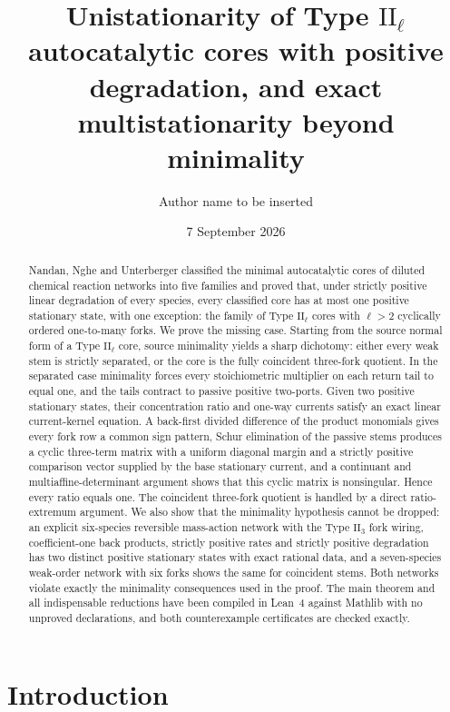 \documentclass[11pt,reqno]{amsart}
\title[Unistationarity of Type $\mathrm{II}_\ell$ autocatalytic cores]{Unistationarity of Type $\mathrm{II}_\ell$ autocatalytic cores with positive degradation, and exact multistationarity beyond minimality}
\author{Author name to be inserted}
\date{7 September 2026}
\theoremstyle{plain}
\theoremstyle{definition}
\theoremstyle{remark}
\numberwithin{equation}{section}
\begin{document}
\begin{abstract}
Nandan, Nghe and Unterberger classified the minimal autocatalytic cores of diluted chemical reaction networks into five families and proved that, under strictly positive linear degradation of every species, every classified core has at most one positive stationary state, with one exception: the family of Type $\mathrm{II}_\ell$ cores with $\ell>2$ cyclically ordered one-to-many forks.  We prove the missing case.  Starting from the source normal form of a Type $\mathrm{II}_\ell$ core, source minimality yields a sharp dichotomy: either every weak stem is strictly separated, or the core is the fully coincident three-fork quotient.  In the separated case minimality forces every stoichiometric multiplier on each return tail to equal one, and the tails contract to passive positive two-ports.  Given two positive stationary states, their concentration ratio and one-way currents satisfy an exact linear current-kernel equation.  A back-first divided difference of the product monomials gives every fork row a common sign pattern, Schur elimination of the passive stems produces a cyclic three-term matrix with a uniform diagonal margin and a strictly positive comparison vector supplied by the base stationary current, and a continuant and multiaffine-determinant argument shows that this cyclic matrix is nonsingular.  Hence every ratio equals one.  The coincident three-fork quotient is handled by a direct ratio-extremum argument.  We also show that the minimality hypothesis cannot be dropped: an explicit six-species reversible mass-action network with the Type $\mathrm{II}_3$ fork wiring, coefficient-one back products, strictly positive rates and strictly positive degradation has two distinct positive stationary states with exact rational data, and a seven-species weak-order network with six forks shows the same for coincident stems.  Both networks violate exactly the minimality consequences used in the proof.  The main theorem and all indispensable reductions have been compiled in Lean~4 against Mathlib with no unproved declarations, and both counterexample certificates are checked exactly.
\end{abstract}

\maketitle

\section{Introduction}\label{sec:intro}
\end{document}
